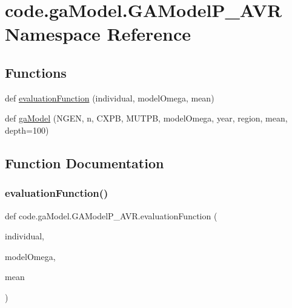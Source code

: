 \hypertarget{namespacecode_1_1ga_model_1_1_g_a_model_p___a_v_r}{}\section{code.\+ga\+Model.\+G\+A\+Model\+P\+\_\+\+A\+VR Namespace Reference}
\label{namespacecode_1_1ga_model_1_1_g_a_model_p___a_v_r}
\subsection*{Functions}
\begin{DoxyCompactItemize}
\item 
def \hyperlink{namespacecode_1_1ga_model_1_1_g_a_model_p___a_v_r_a57c8e6a060152b682247aa84a2042208}{evaluation\+Function} (individual, model\+Omega, mean)
\item 
def \hyperlink{namespacecode_1_1ga_model_1_1_g_a_model_p___a_v_r_a54a6aa539f4e7f9dd54b74a1a808662f}{ga\+Model} (N\+G\+EN, n, C\+X\+PB, M\+U\+T\+PB, model\+Omega, year, region, mean, depth=100)
\end{DoxyCompactItemize}


\subsection{Function Documentation}
\mbox{\label{namespacecode_1_1ga_model_1_1_g_a_model_p___a_v_r_a57c8e6a060152b682247aa84a2042208}} 
\subsubsection{\texorpdfstring{evaluation\+Function()}{evaluationFunction()}}
{\footnotesize\ttfamily def code.\+ga\+Model.\+G\+A\+Model\+P\+\_\+\+A\+V\+R.\+evaluation\+Function (\begin{DoxyParamCaption}\item[{}]{individual,  }\item[{}]{model\+Omega,  }\item[{}]{mean }\end{DoxyParamCaption})}

